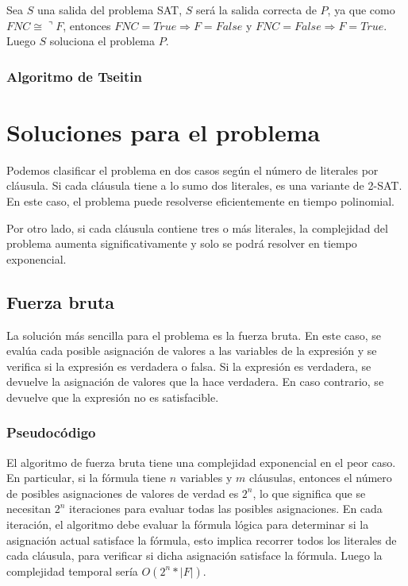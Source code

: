 \documentclass{article}
\begin{document}
            Sea $S$ una salida del problema SAT, $S$ será la salida correcta de $P$, ya que como $FNC \cong \urcorner F$, entonces 
            $FNC = True \Rightarrow  F = False$ y $FNC = False \Rightarrow F = True$. Luego $S$ soluciona el problema $P$.

        \subsubsection*{Algoritmo de Tseitin}
    
\section*{Soluciones para el problema}

    Podemos clasificar el problema en dos casos según el número 
    de literales por cláusula. Si cada cláusula tiene a lo sumo dos literales, es una variante de 2-SAT. 
    En este caso, el problema puede resolverse eficientemente en tiempo polinomial.

    Por otro lado, si cada cláusula contiene tres o más literales, la complejidad del problema 
    aumenta significativamente y solo se podrá resolver en tiempo exponencial.

    \subsection*{Fuerza bruta}

        La solución más sencilla para el problema es la fuerza bruta. En este caso, se evalúa 
        cada posible asignación de valores a las variables de la expresión y se verifica si la 
        expresión es verdadera o falsa. Si la expresión es verdadera, se devuelve la asignación 
        de valores que la hace verdadera. En caso contrario, se devuelve que la expresión no es 
        satisfacible.

        \subsubsection*{Pseudocódigo}


            El algoritmo de fuerza bruta tiene una complejidad exponencial en el peor caso. En 
            particular, si la fórmula tiene $n$ variables y $m$ cláusulas, entonces el número
            de posibles asignaciones de valores de verdad es $2^n$, lo que significa que se necesitan 
            $2^n$ iteraciones para evaluar todas las posibles asignaciones. En cada iteración, el 
            algoritmo debe evaluar la fórmula lógica para determinar si la asignación actual satisface la 
            fórmula, esto implica recorrer todos los literales de cada cláusula, para 
            verificar si dicha asignación satisface la fórmula. Luego la complejidad temporal 
            sería $O(2^n * |F|)$.
    
\end{document}
